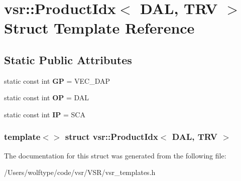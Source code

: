 \hypertarget{structvsr_1_1_product_idx_3_01_d_a_l_00_01_t_r_v_01_4}{\section{vsr\-:\-:Product\-Idx$<$ D\-A\-L, T\-R\-V $>$ Struct Template Reference}
\label{structvsr_1_1_product_idx_3_01_d_a_l_00_01_t_r_v_01_4}
}
\subsection*{Static Public Attributes}
\begin{DoxyCompactItemize}
\item 
\hypertarget{structvsr_1_1_product_idx_3_01_d_a_l_00_01_t_r_v_01_4_a6d51bc7aadc8773a217c8df7bd4ae14b}{static const int {\bfseries G\-P} = V\-E\-C\-\_\-\-D\-A\-P}\label{structvsr_1_1_product_idx_3_01_d_a_l_00_01_t_r_v_01_4_a6d51bc7aadc8773a217c8df7bd4ae14b}

\item 
\hypertarget{structvsr_1_1_product_idx_3_01_d_a_l_00_01_t_r_v_01_4_ab615f4129d8cd980e02484c68aad3ced}{static const int {\bfseries O\-P} = D\-A\-L}\label{structvsr_1_1_product_idx_3_01_d_a_l_00_01_t_r_v_01_4_ab615f4129d8cd980e02484c68aad3ced}

\item 
\hypertarget{structvsr_1_1_product_idx_3_01_d_a_l_00_01_t_r_v_01_4_aac3793af89c9b9841b1d2e63f0020b6b}{static const int {\bfseries I\-P} = S\-C\-A}\label{structvsr_1_1_product_idx_3_01_d_a_l_00_01_t_r_v_01_4_aac3793af89c9b9841b1d2e63f0020b6b}

\end{DoxyCompactItemize}
\subsubsection*{template$<$$>$ struct vsr\-::\-Product\-Idx$<$ D\-A\-L, T\-R\-V $>$}



The documentation for this struct was generated from the following file\-:\begin{DoxyCompactItemize}
\item 
/\-Users/wolftype/code/vsr/\-V\-S\-R/vsr\-\_\-templates.\-h\end{DoxyCompactItemize}
